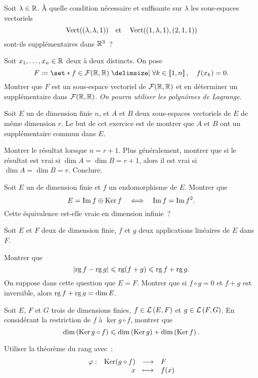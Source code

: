 \documentclass{magnolia}
\begin{document}
Soit $\lambda\in\mathbb{R}$. À quelle condition nécessaire et suffisante
sur $\lambda$ les sous-espaces vectoriels
\[\operatorname{Vect}((\lambda,\lambda,1))\quad\text{et}\quad
  \operatorname{Vect}((1,\lambda,1),(2,1,1))\]
sont-ils supplémentaires dans $\mathbb{R}^3$~?

Soit $x_1,\ldots,x_n\in\mathbb{R}$ deux à deux distincts. On pose
\[F\defeq\enstq{f\in\mathcal{F}(\R,\R)}{\forall k\in\intere{1}{n}\qsep f(x_k)=0}.\]
Montrer que $F$ est un sous-espace vectoriel de $\mathcal{F}(\mathbb{R},\mathbb{R})$
et en déterminer un supplémentaire dans $\mathcal{F}(\mathbb{R},\mathbb{R})$. \emph{On pourra utiliser
les polynômes de Lagrange}.

Soit $E$ un \Kev de dimension finie $n$, et $A$ et $B$ deux sous-espaces
vectoriels de $E$ de même dimension $r$. Le but de cet exercice est de montrer
que $A$ et $B$ ont un supplémentaire commun dans $E$.
\begin{questions}
\question Montrer le résultat lorsque $n=r+1$.
\question Plus généralement, montrer que si le résultat est vrai si
  $\dim A=\dim B=r+1$, alors il est vrai si $\dim A=\dim B=r$.
\question Conclure.
\end{questions}




Soit $E$ un \Kev de dimension finie et $f$ un endomorphisme de $E$. Montrer
que
\[E=\operatorname{Im} f \oplus \mathop{\rm Ker} f  \quad\Longleftrightarrow\quad
 \operatorname{Im} f = \operatorname{Im} f^2.\]
Cette équivalence est-elle vraie en dimension infinie~?


 

Soit $E$ et $F$ deux \Kev de dimension finie, $f$ et $g$ deux applications
linéaires de $E$ dans $F$.
\begin{questions}
\question Montrer que
  \[\left|\operatorname{rg} f-\operatorname{rg} g\right| \leqslant \operatorname{rg} (f+g) \leqslant \operatorname{rg} f+\operatorname{rg} g.\]
\question On suppose dans cette question que $E=F$. Montrer que si
  $f\circ g=0$ et $f+g$ est inversible, alors $\operatorname{rg} f+\operatorname{rg} g=\dim E$.
\end{questions}

Soit $E$, $F$ et $G$ trois \Kevs de dimensions finies, $f\in\mathcal{L}\left(E,F\right)$ et
$g\in\mathcal{L}\left(F,G\right)$. En considérant la restriction de $f$ à
$\ker g\circ f$, montrer que
\[\dim\left(\mathop{\rm Ker} g\circ f\right) \leqslant \dim\left(\mathop{\rm Ker} g\right) + \dim\left(\mathop{\rm Ker} f\right).\]
\begin{sol}
Utiliser la théorème du rang avec~:
\[\begin{array}[t]{lrcl} \displaystyle{\varphi} : & \displaystyle{\mathop{\rm Ker}(g\circ f)} & \longrightarrow & \displaystyle{F} \\ & \displaystyle{x} & \longmapsto & \displaystyle{f(x)} \end{array}\]
\end{sol}
\end{document}
